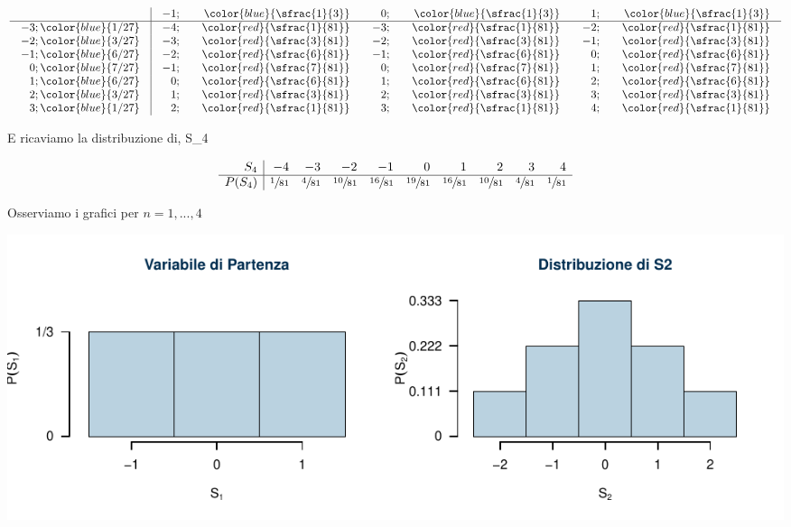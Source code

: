 \documentclass[
  11pt,
]{book}
\theoremstyle{mytheoremstyle}
\theoremstyle{mydefstyle}
\begin{document}
\normalsize

\[\arraycolsep=10pt\def\arraystretch{1}\begin{array}{ r|rrrrrr }
& -1 ;&\color{blue}{ \sfrac{ 1 } { 3 }} & 0 ;&\color{blue}{ \sfrac{ 1 } { 3 }} & 1 ;&\color{blue}{ \sfrac{ 1 } { 3 }} \\ 
\hline 
-3 ;\color{blue}{ 1 / 27 }& -4;&\color{red}{\sfrac{1}{81}}& -3;&\color{red}{\sfrac{1}{81}}& -2;&\color{red}{\sfrac{1}{81}}\\ 
-2 ;\color{blue}{ 3 / 27 }& -3;&\color{red}{\sfrac{3}{81}}& -2;&\color{red}{\sfrac{3}{81}}& -1;&\color{red}{\sfrac{3}{81}}\\ 
-1 ;\color{blue}{ 6 / 27 }& -2;&\color{red}{\sfrac{6}{81}}& -1;&\color{red}{\sfrac{6}{81}}& 0;&\color{red}{\sfrac{6}{81}}\\ 
0 ;\color{blue}{ 7 / 27 }& -1;&\color{red}{\sfrac{7}{81}}& 0;&\color{red}{\sfrac{7}{81}}& 1;&\color{red}{\sfrac{7}{81}}\\ 
1 ;\color{blue}{ 6 / 27 }& 0;&\color{red}{\sfrac{6}{81}}& 1;&\color{red}{\sfrac{6}{81}}& 2;&\color{red}{\sfrac{6}{81}}\\ 
2 ;\color{blue}{ 3 / 27 }& 1;&\color{red}{\sfrac{3}{81}}& 2;&\color{red}{\sfrac{3}{81}}& 3;&\color{red}{\sfrac{3}{81}}\\ 
3 ;\color{blue}{ 1 / 27 }& 2;&\color{red}{\sfrac{1}{81}}& 3;&\color{red}{\sfrac{1}{81}}& 4;&\color{red}{\sfrac{1}{81}}\\ 
\end{array}
 \]

\normalsize E ricaviamo la distribuzione di, S\_4

\normalsize

\[
     \begin{array}{ r|rrrrrrrrr }
 S_4  & -4& -3& -2& -1& 0& 1& 2& 3& 4 \\ 
 \hline 
 P( S_4 ) & \sfrac{1}{81}& \sfrac{4}{81}& \sfrac{10}{81}& \sfrac{16}{81}& \sfrac{19}{81}& \sfrac{16}{81}& \sfrac{10}{81}& \sfrac{4}{81}& \sfrac{1}{81} \\ 
 \end{array}
 \]

Osserviamo i grafici per \(n=1,...,4\)

\begin{center}\includegraphics{Appunti_di_Statistica_2025_files/figure-latex/08-tlc-7-1} \end{center}
\end{document}
